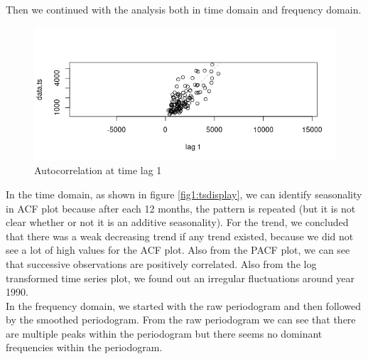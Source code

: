 \documentclass[journal, a4paper]{IEEEtran}
\begin{document}
Then we continued with the analysis both in time domain and frequency domain.
\begin{figure}[H]
\begin{center}
\includegraphics[scale=0.4]{fig1/successiveRelations.png}
\caption{Autocorrelation at time lag 1}
\label{fig1:successive}
\end{center}
\end{figure}



In the time domain, as shown in figure \ref{fig1:tsdisplay}, we can identify seasonality in ACF plot because after each 12 months, the pattern is repeated (but it is not clear whether or not it is an additive seasonality). For the trend, we concluded that there was a weak decreasing trend if any trend existed, because we did not see a lot of high values for the ACF plot. Also from the PACF plot, we can see that successive observations are positively correlated. Also from the log transformed time series plot,  we found out an irregular fluctuations around year 1990.\\
In the frequency domain, we started with the raw periodogram and then followed by the smoothed periodogram. From the raw periodogram we can see that there are multiple peaks within the periodogram but there seems no dominant frequencies within the periodogram.
\end{document}
